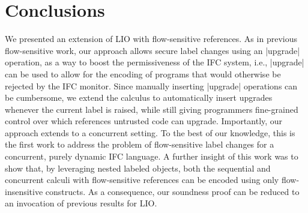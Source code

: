 \section{Conclusions}
\label{sec:conclusion}

We presented an extension of LIO with flow-sensitive references.
%
As in previous flow-sensitive work, our approach allows secure label
changes using an |upgrade| operation, as a way to boost the
permissiveness of the IFC system, i.e., |upgrade| can be used to
allow for the encoding of programs that would otherwise be rejected by
the IFC monitor.
%
Since manually inserting |upgrade| operations can be cumbersome, we
extend the calculus to automatically insert upgrades whenever the
current label is raised, while still giving programmers fine-grained
control over which references untrusted code can upgrade.
%
Importantly, our approach extends to a concurrent setting.
%
To the best of our knowledge, this is the first work to address the
problem of flow-sensitive label changes for a concurrent, purely
dynamic IFC language.
%
A further insight of this work was to show that, by leveraging nested
labeled objects, both the sequential and concurrent calculi with
flow-sensitive references can be encoded using only flow-insensitive
constructs.
%
As a consequence, our soundness proof can be reduced to an invocation
of previous results for LIO.

